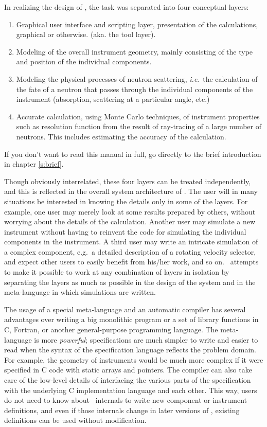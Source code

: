 In realizing the design of \MCS, the task was
separated into four conceptual layers:
\begin{enumerate}
\item Graphical user interface and scripting layer, presentation of
  the calculations, graphical or otherwise. (aka. the tool layer).
\item Modeling of the overall instrument geometry, mainly consisting
  of the type and position of the individual components.
\item Modeling the physical processes of neutron scattering, \textit{i.e}.\
  the calculation of the fate of a neutron that passes through the
  individual components of the instrument (absorption, scattering at a
  particular angle, etc.)
\item Accurate calculation, using Monte Carlo techniques, of
  instrument properties such as resolution function from the result of
  ray-tracing of a large number of neutrons. This includes estimating
  the accuracy of the calculation.
\end{enumerate}

If you don't want to read this manual in full, go directly to the brief introduction in chapter \ref{s:brief}.

Though obviously interrelated, these four layers can be
treated independently, and this is reflected in the overall system
architecture of \MCS. The user will in many situations be
interested in knowing the details only in some of the layers. For
example, one user may merely look at some results prepared by others,
without worrying about the details of the calculation. Another user
may simulate a new instrument without having to reinvent the
code for simulating the individual components in the instrument. A third
user may write an intricate simulation of a complex component,
e.g.\ a detailed description of a rotating velocity selector,
and expect other users to easily
benefit from his/her work, and so on. \MCS\ attempts to make it
possible to work at any combination of layers in isolation by separating
the layers as much as possible in the design of the system and in
the meta-language in which simulations are written.

The usage of a special meta-language and an automatic compiler has
several advantages over writing a big monolithic program or a set of
library functions in C, Fortran, or another general-purpose programming
language.  The meta-language is more \textit{powerful}; specifications
are much simpler to write and easier to read when the syntax of the
specification language reflects the problem domain. For example, the
geometry of instruments would be much more complex if it were specified
in C code with static arrays and pointers. The compiler can also take
care of the low-level details of interfacing the various parts of the
specification with the underlying C implementation language and each
other. This way, users do not need to know about \MCS\ internals to
write new component or instrument definitions, and even if those
internals change in later versions of \MCS, existing definitions can be
used without modification.

